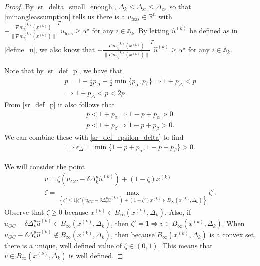 \documentclass{article}
\theoremstyle{case}
\newcommand{\activeconstraintsk}{{\mathbb A_{k}}}
\newcommand{\dk}{\Delta_k}
\newcommand{\dsr}{{\Delta_{\text{sr}}}}
\newcommand{\gmcik}{{\nabla m_{c_i}^{(k)}\left(\xk\right)}}
\newcommand{\huk}{{{\hat u}^{(k)}}}
\newcommand{\minanglealpha}{{ \alpha^{\star} }}
\newcommand{\minangledelta}{{\Delta_{\alpha^{\star}}}}
\newcommand{\minangleu}{{u_{\textrm{feas}}}}
\newcommand{\Rn}{\mathbb R^n}
\newcommand{\tr}{{ B_{\infty}\left(\xk, \dk\right) }}
\newcommand{\xk}{{x^{(k)}}}
\begin{document}
\begin{proof}
By \cref{sr_delta_small_enough}, $\dk \le \dsr \le \minangledelta$ so that \cref{minangleassumption}
tells us there is a $\minangleu \in \Rn$ with $-\frac {\gmcik}{\|\gmcik\|} ^T\minangleu \ge \minanglealpha$ for any $i \in \activeconstraintsk$.
By letting $\huk$ be defined as in \cref{define_u},
we also know that $-\frac {\gmcik}{\|\gmcik\|} ^T\huk \ge \minanglealpha$ for any $i \in \activeconstraintsk$.

Note that by \cref{sr_def_p}, we have that
\begin{align}
p = 1 + \frac 1 2 p_{\Delta} + \frac 1 2 \min\{p_{\alpha}, p_{\beta} \} \Longrightarrow 1 + p_{\Delta} < p \nonumber \\
\Longrightarrow 1 + p_{\Delta} < p < 2p \label{sr_p_big}
\end{align}
From \cref{sr_def_p} it also follows that
\begin{align}
p < 1 + p_{\alpha} \Longrightarrow 1 - p + p_{\alpha} > 0  \label{sr_p_small_alpha} \\
p < 1 + p_{\beta}\Longrightarrow 1 - p + p_{\beta} > 0 \label{sr_p_small_beta}.
\end{align}
We can combine these with \cref{sr_def_epsilon_delta} to find
\begin{align}
\Longrightarrow \epsilon_{\Delta} = \min\{1 - p + p_{\alpha}, 1 - p + p_{\beta} \} > 0 \label{sr_epsilon_delta_positive}.
\end{align}

We will consider the point 
\begin{align}
v = \zeta \left(u_{GC} - \delta \dk^{p} \huk \right) + (1-\zeta)\xk \label{define_v} \\
\zeta = \max_{\left\{\zeta' \le 1 | \zeta' \left(u_{GC} - \delta \dk^{p} \huk\right) + (1-\zeta')\xk \in \tr\right\}} \zeta' \label{define_zeta}.
\end{align}
Observe that $\zeta \ge 0$ because $\xk \in \tr$.
Also, if $u_{GC} - \delta \dk^{p} \huk\in\tr$, then $\zeta' = 1 \Longrightarrow v \in \tr$.
When $u_{GC} - \delta \dk^{p} \huk \not\in\tr$, then because $\tr$ is a convex set, there is a unique, well defined value of $\zeta \in (0, 1)$.
This means that $v \in \tr$ is well defined.



\end{proof}
\end{document}
